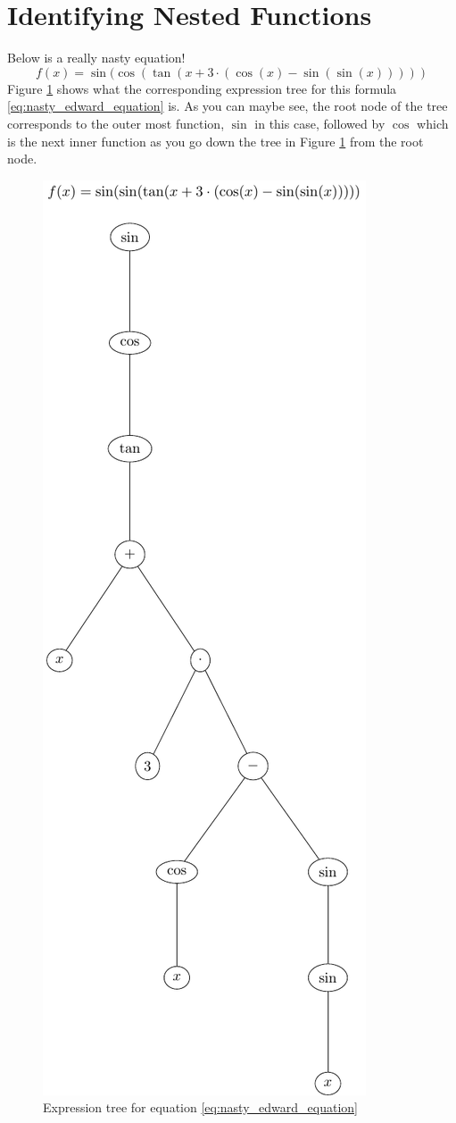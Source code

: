 \documentclass{article}
\begin{document}
\section{Identifying Nested Functions}
Below is a really nasty equation!
\begin{equation}
    f(x) = \sin(\cos(\tan(x+3\cdot (\cos(x) - \sin(\sin(x))))) \label{eq:nasty_edward_equation}
\end{equation}
Figure \ref{fig:nasty_edward_equation} shows what the corresponding expression tree for this formula \ref{eq:nasty_edward_equation} is. As you can maybe see, the root node of the tree corresponds to the outer most function, $\sin$ in this case, followed by $\cos$ which is the next inner function as you go down the tree in Figure \ref{fig:nasty_edward_equation} from the root node.  
\begin{figure}
    \centering
    \includegraphics[width=0.52\linewidth]{nasty_edward_equation.pdf}
    \caption{Expression tree for equation \ref{eq:nasty_edward_equation}}
    \label{fig:nasty_edward_equation}
\end{figure}
\end{document}
